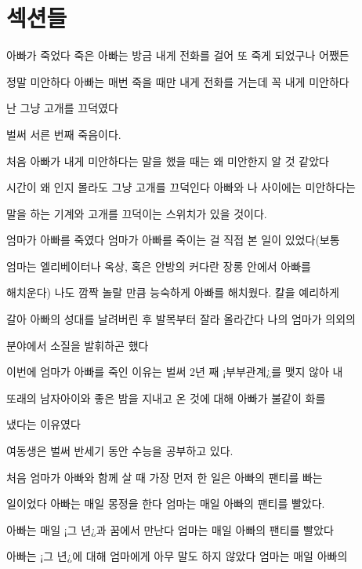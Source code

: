 \hypertarget{uxc139uxc158uxb4e4}{%

\section{섹션들}\label{uxc139uxc158uxb4e4}}



아빠가 죽었다 죽은 아빠는 방금 내게 전화를 걸어 또 죽게 되었구나 어쨌든

정말 미안하다 아빠는 매번 죽을 때만 내게 전화를 거는데 꼭 내게 미안하다

난 그냥 고개를 끄덕였다



벌써 서른 번째 죽음이다.



처음 아빠가 내게 미안하다는 말을 했을 때는 왜 미안한지 알 것 같았다

시간이 왜 인지 몰라도 그냥 고개를 끄덕인다 아빠와 나 사이에는 미안하다는

말을 하는 기계와 고개를 끄덕이는 스위치가 있을 것이다.



엄마가 아빠를 죽였다 엄마가 아빠를 죽이는 걸 직접 본 일이 있었다(보통

엄마는 엘리베이터나 옥상, 혹은 안방의 커다란 장롱 안에서 아빠를

해치운다) 나도 깜짝 놀랄 만큼 능숙하게 아빠를 해치웠다. 칼을 예리하게

갈아 아빠의 성대를 날려버린 후 발목부터 잘라 올라간다 나의 엄마가 의외의

분야에서 소질을 발휘하곤 했다



이번에 엄마가 아빠를 죽인 이유는 벌써 2년 째 ¡부부관계¿를 맺지 않아 내

또래의 남자아이와 좋은 밤을 지내고 온 것에 대해 아빠가 불같이 화를

냈다는 이유였다



여동생은 벌써 반세기 동안 수능을 공부하고 있다.



처음 엄마가 아빠와 함께 살 때 가장 먼저 한 일은 아빠의 팬티를 빠는

일이었다 아빠는 매일 몽정을 한다 엄마는 매일 아빠의 팬티를 빨았다.

아빠는 매일 ¡그 년¿과 꿈에서 만난다 엄마는 매일 아빠의 팬티를 빨았다

아빠는 ¡그 년¿에 대해 엄마에게 아무 말도 하지 않았다 엄마는 매일 아빠의

